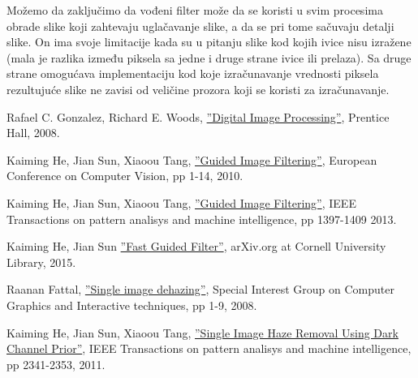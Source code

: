 \documentclass[a4paper,12pt,titlepage]{article}
\begin{document}
Možemo da zaključimo da vođeni filter može da se koristi u svim procesima obrade slike koji zahtevaju uglačavanje slike, a da se pri tome sačuvaju detalji slike. On ima svoje limitacije kada su u pitanju slike kod kojih ivice nisu izražene (mala je razlika između piksela sa jedne i druge strane ivice ili prelaza). Sa druge strane omogućava implementaciju kod koje izračunavanje vrednosti piksela rezultujuće slike ne zavisi od veličine prozora koji se koristi za izračunavanje.

\newpage
{}
\begin{thebibliography}{10}

Rafael C. Gonzalez, Richard E. Woods,
\href{https://books.google.rs/books?id=8uGOnjRGEzoC&redir_esc=y}{''Digital Image Processing''},
Prentice Hall,
2008.

Kaiming He, Jian Sun, Xiaoou Tang,
\href{http://kaiminghe.com/publications/eccv10guidedfilter.pdf}{''Guided Image Filtering''},
European Conference on Computer Vision, pp 1-14,
2010.

Kaiming He, Jian Sun, Xiaoou Tang,
\href{http://kaiminghe.com/publications/pami12guidedfilter.pdf}{''Guided Image Filtering''},
IEEE Transactions on pattern analisys and machine intelligence, pp 1397-1409
2013.

Kaiming He, Jian Sun
\href{https://arxiv.org/pdf/1505.00996.pdf}{''Fast Guided Filter''},
arXiv.org at Cornell University Library,
2015.

Raanan Fattal,
\href{http://citeseerx.ist.psu.edu/viewdoc/download?doi=10.1.1.456.2558&rep=rep1&type=pdf}{''Single image dehazing''},
Special Interest Group on Computer Graphics and Interactive techniques, pp 1-9,
2008.

Kaiming He, Jian Sun, Xiaoou Tang,
\href{http://citeseerx.ist.psu.edu/viewdoc/download?doi=10.1.1.456.2558&rep=rep1&type=pdf}{''Single Image Haze Removal
Using Dark Channel Prior''},
IEEE Transactions on pattern analisys and machine intelligence, pp 2341-2353,
2011.

\end{thebibliography}
\end{document}
